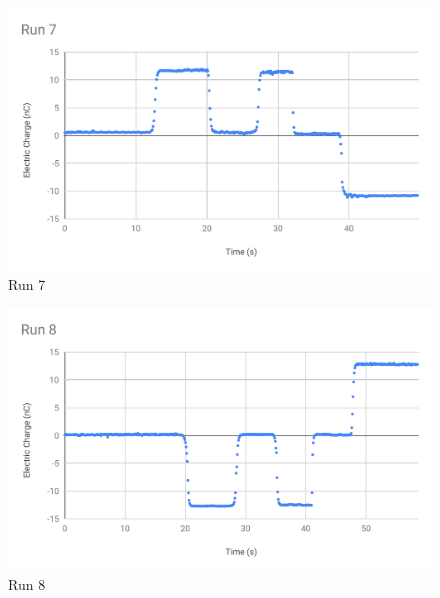 %
\begin{figure}[ht]
	\centering
	\includegraphics[scale=0.74]{image/01-electro/Run7.pdf}
	\caption{Run 7}
	\label{figure.01.run.7}
\end{figure}
%
\begin{figure}[ht]
	\centering
	\includegraphics[scale=0.74]{image/01-electro/Run8.pdf}
	\caption{Run 8}
	\label{figure.01.run.8}
\end{figure}
%